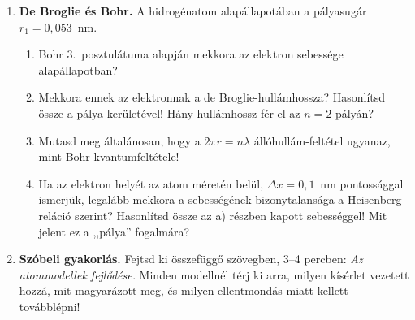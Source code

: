 \documentclass[12pt]{article}
\begin{document}
\vspace{6pt}
\begin{enumerate}[start=6]
\item \textbf{De Broglie és Bohr.} A hidrogénatom alapállapotában a pályasugár
  $r_1 = 0{,}053$~nm.
  \begin{enumerate}
    \item Bohr 3.~posztulátuma alapján mekkora az elektron sebessége alapállapotban?
    \item Mekkora ennek az elektronnak a de Broglie-hullámhossza? Hasonlítsd össze a pálya
      kerületével! Hány hullámhossz fér el az $n = 2$ pályán?
    \item Mutasd meg általánosan, hogy a $2\pi r = n\lambda$ állóhullám-feltétel
      ugyanaz, mint Bohr kvantumfeltétele!
    \item Ha az elektron helyét az atom méretén belül, $\Delta x = 0{,}1$~nm pontossággal
      ismerjük, legalább mekkora a sebességének bizonytalansága a Heisenberg-reláció
      szerint? Hasonlítsd össze az a) részben kapott sebességgel! Mit jelent ez a
      ,,pálya'' fogalmára?
  \end{enumerate}

\item \textbf{Szóbeli gyakorlás.} Fejtsd ki összefüggő szövegben, 3--4 percben: \emph{Az
  atommodellek fejlődése.} Minden modellnél térj ki arra, milyen kísérlet vezetett
  hozzá, mit magyarázott meg, és milyen ellentmondás miatt kellett továbblépni!
\end{enumerate}
\end{document}

